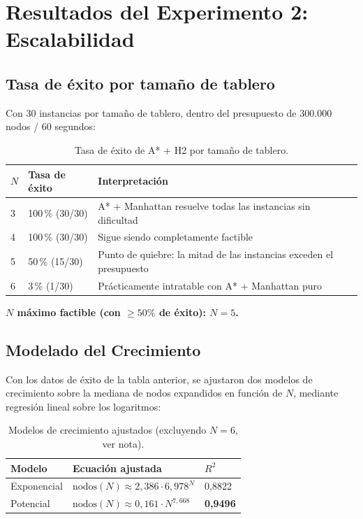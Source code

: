 \documentclass[11pt]{article}
\begin{document}
\section{Resultados del Experimento 2: Escalabilidad}

\subsection{Tasa de éxito por tamaño de tablero}
Con 30 instancias por tamaño de tablero, dentro del presupuesto de 300.000
nodos / 60 segundos:

\begin{table}[H]
\centering
\caption{Tasa de éxito de A* + H2 por tamaño de tablero.}
\begin{tabular}{lll}
\toprule
$N$ & Tasa de éxito & Interpretación \\
\midrule
3 & 100\,\% (30/30) & A* + Manhattan resuelve todas las instancias sin dificultad \\
4 & 100\,\% (30/30) & Sigue siendo completamente factible \\
5 & 50\,\% (15/30) & Punto de quiebre: la mitad de las instancias exceden el presupuesto \\
6 & 3\,\% (1/30) & Prácticamente intratable con A* + Manhattan puro \\
\bottomrule
\end{tabular}
\end{table}

\noindent
\textbf{$N$ máximo factible (con $\ge 50\%$ de éxito): $N=5$.}

\subsection{Modelado del Crecimiento}
Con los datos de éxito de la tabla anterior, se ajustaron dos modelos de
crecimiento sobre la mediana de nodos expandidos en función de $N$, mediante
regresión lineal sobre los logaritmos:

\begin{table}[H]
\centering
\caption{Modelos de crecimiento ajustados (excluyendo $N=6$, ver nota).}
\begin{tabular}{lll}
\toprule
Modelo & Ecuación ajustada & $R^2$ \\
\midrule
Exponencial & $\mathrm{nodos}(N) \approx 2{,}386\cdot 6{,}978^{N}$ & 0,8822 \\
Potencial & $\mathrm{nodos}(N) \approx 0{,}161\cdot N^{7{,}668}$ & \textbf{0,9496} \\
\bottomrule
\end{tabular}
\end{table}
\end{document}
